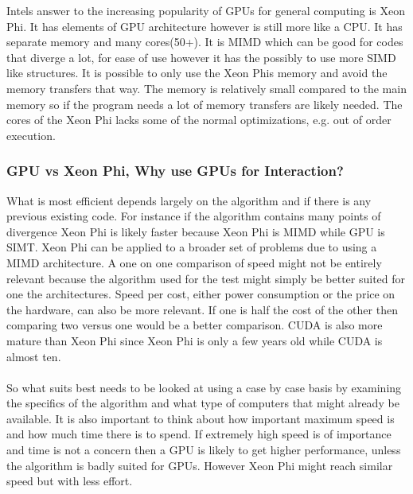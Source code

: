 \documentclass[10pt,a4paper]{report}
\begin{document}
Intels answer to the increasing popularity of GPUs for general computing is Xeon Phi\cite{jeffers2013intel}. It has elements of GPU architecture however is still more like a CPU. It has separate memory and many cores(50+)\cite{jeffers2013intel}. It is MIMD which can be good for codes that diverge a lot, for ease of use however it has the possibly to use more SIMD like structures\cite{jeffers2013intel}. It is possible to only use the Xeon Phis memory and avoid the memory transfers that way. The memory is relatively small compared to the main memory so if the program needs a lot of memory transfers are likely needed. The cores of the Xeon Phi lacks some of the normal optimizations, e.g. out of order execution\cite{jeffers2013intel}.

\subsubsection{GPU vs Xeon Phi, Why use GPUs for Interaction?}
\label{gpu_gwas}
What is most efficient depends largely on the algorithm and if there is any previous existing code. For instance if the algorithm contains many points of divergence Xeon Phi is likely faster because Xeon Phi is MIMD while GPU is SIMT. Xeon Phi can be applied to a broader set of problems due to using a MIMD architecture\cite{jeffers2013intel}. A one on one comparison of speed might not be entirely relevant because the algorithm used for the test might simply be better suited for one the architectures. Speed per cost, either power consumption or the price on the hardware, can also be more relevant. If one is half the cost of the other then comparing two versus one would be a better comparison. CUDA is also more mature than Xeon Phi since Xeon Phi is only a few years old while CUDA is almost ten\cite{cuda, jeffers2013intel}.\\
\\
So what suits best needs to be looked at using a case by case basis by examining the specifics of the algorithm and what type of computers that might already be available. It is also important to think about how important maximum speed is and how much time there is to spend. If extremely high speed is of importance and time is not a concern then a GPU is likely to get higher performance, unless the algorithm is badly suited for GPUs. However Xeon Phi might reach similar speed but with less effort.\\
\\
\end{document}
